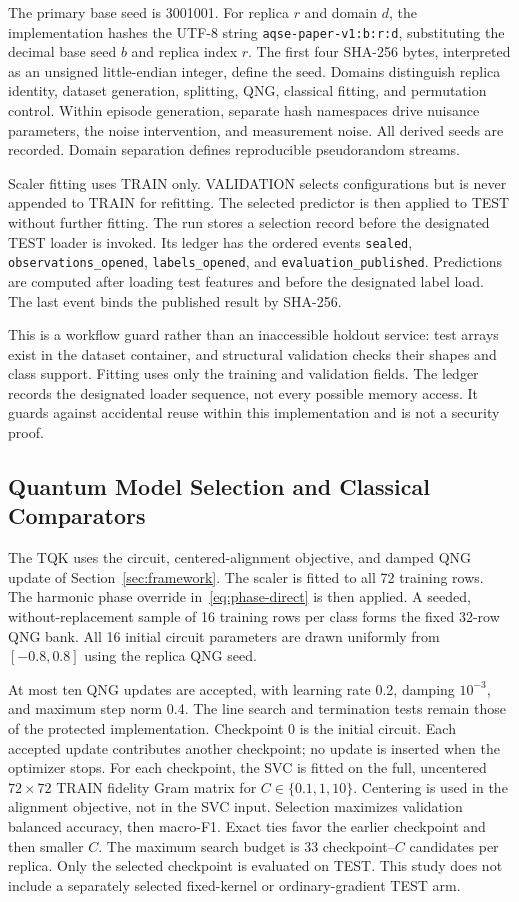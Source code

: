 The primary base seed is 3001001. For replica $r$ and domain $d$, the implementation hashes the UTF-8 string \texttt{aqse-paper-v1:b:r:d}, substituting the decimal base seed $b$ and replica index $r$. The first four SHA-256 bytes, interpreted as an unsigned little-endian integer, define the seed. Domains distinguish replica identity, dataset generation, splitting, QNG, classical fitting, and permutation control. Within episode generation, separate hash namespaces drive nuisance parameters, the noise intervention, and measurement noise. All derived seeds are recorded. Domain separation defines reproducible pseudorandom streams.

Scaler fitting uses TRAIN only. VALIDATION selects configurations but is never appended to TRAIN for refitting. The selected predictor is then applied to TEST without further fitting. The run stores a selection record before the designated TEST loader is invoked. Its ledger has the ordered events \texttt{sealed}, \texttt{observations\_opened}, \texttt{labels\_opened}, and \texttt{evaluation\_published}. Predictions are computed after loading test features and before the designated label load. The last event binds the published result by SHA-256.

This is a workflow guard rather than an inaccessible holdout service: test arrays exist in the dataset container, and structural validation checks their shapes and class support. Fitting uses only the training and validation fields. The ledger records the designated loader sequence, not every possible memory access. It guards against accidental reuse within this implementation and is not a security proof.

\subsection{Quantum Model Selection and Classical Comparators}
\label{sec:methods-models}

The TQK uses the circuit, centered-alignment objective, and damped QNG update of Section~\ref{sec:framework}. The scaler is fitted to all 72 training rows. The harmonic phase override in~\eqref{eq:phase-direct} is then applied. A seeded, without-replacement sample of 16 training rows per class forms the fixed 32-row QNG bank. All 16 initial circuit parameters are drawn uniformly from $[-0.8,0.8]$ using the replica QNG seed.

At most ten QNG updates are accepted, with learning rate 0.2, damping $10^{-3}$, and maximum step norm 0.4. The line search and termination tests remain those of the protected implementation. Checkpoint 0 is the initial circuit. Each accepted update contributes another checkpoint; no update is inserted when the optimizer stops. For each checkpoint, the SVC is fitted on the full, uncentered $72\times72$ TRAIN fidelity Gram matrix for $C\in\{0.1,1,10\}$. Centering is used in the alignment objective, not in the SVC input. Selection maximizes validation balanced accuracy, then macro-F1. Exact ties favor the earlier checkpoint and then smaller $C$. The maximum search budget is 33 checkpoint--$C$ candidates per replica. Only the selected checkpoint is evaluated on TEST. This study does not include a separately selected fixed-kernel or ordinary-gradient TEST arm.

